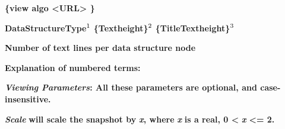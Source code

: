 \documentclass[12pt]{article}
\begin{document}
\begin{flushleft}
\textbf{{\footnotesize{}\{view algo <URL> \}}}
\end{flushleft}

\begin{flushleft}
\textbf{{\footnotesize{}DataStructureType}}\textbf{$^{\mathrm{{\footnotesize{}1}}}$}\textbf{{\footnotesize{} \{Textheight\}}}\textbf{$^{\mathrm{{\footnotesize{}2}}}$}\textbf{{\footnotesize{} \{TitleTextheight\}}}\textbf{$^{\mathrm{{\footnotesize{}3}}}$}
\end{flushleft}

\begin{flushleft}
\textbf{{\footnotesize{}Number of  text lines per data structure node  }}
\end{flushleft}

\begin{flushleft}

\end{flushleft}

\begin{flushleft}
\textbf{{\footnotesize{}Explanation of numbered terms:}}
\end{flushleft}

\begin{flushleft}

\end{flushleft}

\begin{flushleft}
\textbf{\textit{{\footnotesize{}Viewing Parameters}}}\textbf{{\footnotesize{}:  All these parameters are optional, and case-insensitive. }}
\end{flushleft}

\begin{flushleft}

\end{flushleft}

\begin{flushleft}
\textbf{\textit{{\footnotesize{}Scale}}}\textbf{{\footnotesize{} will scale the snapshot by }}\textbf{\textit{{\footnotesize{}x}}}\textbf{{\footnotesize{}, where }}\textbf{\textit{{\footnotesize{}x}}}\textbf{{\footnotesize{} is a real, 0 < }}\textbf{\textit{{\footnotesize{}x}}}\textbf{{\footnotesize{} <= 2. }}
\end{flushleft}

\end{document}

